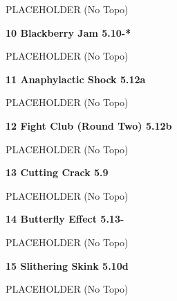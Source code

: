 \begin{multicols}{2}
\begin{adjustwidth}{0.5cm}{}			
PLACEHOLDER (No Topo)
\end{adjustwidth}



\needspace{1.5cm}
\label{rt:Blackberry Jam}
\colorbox{RoyalBlue!20}{
\parbox{0.95\linewidth}{
\textbf{
10 Blackberry Jam 5.10-*  
}}}

\begin{adjustwidth}{0.5cm}{}			
PLACEHOLDER (No Topo)
\end{adjustwidth}



\needspace{1.5cm}
\label{rt:Anaphylactic Shock}
\colorbox{Goldenrod!50}{
\parbox{0.95\linewidth}{
\textbf{
11 Anaphylactic Shock 5.12a  
}}}

\begin{adjustwidth}{0.5cm}{}			
PLACEHOLDER (No Topo)
\end{adjustwidth}



\needspace{1.5cm}
\label{rt:Fight Club (Round Two)}
\colorbox{Goldenrod!50}{
\parbox{0.95\linewidth}{
\textbf{
12 Fight Club (Round Two) 5.12b  
}}}

\begin{adjustwidth}{0.5cm}{}			
PLACEHOLDER (No Topo)
\end{adjustwidth}



\needspace{1.5cm}
\label{rt:Cutting Crack}
\colorbox{green!20}{
\parbox{0.95\linewidth}{
\textbf{
13 Cutting Crack 5.9  
}}}

\begin{adjustwidth}{0.5cm}{}			
PLACEHOLDER (No Topo)
\end{adjustwidth}



\needspace{1.5cm}
\label{rt:Butterfly Effect}
\colorbox{Goldenrod!50}{
\parbox{0.95\linewidth}{
\textbf{
14 Butterfly Effect 5.13-  
}}}

\begin{adjustwidth}{0.5cm}{}			
PLACEHOLDER (No Topo)
\end{adjustwidth}



\needspace{1.5cm}
\label{rt:Slithering Skink}
\colorbox{RoyalBlue!20}{
\parbox{0.95\linewidth}{
\textbf{
15 Slithering Skink 5.10d  
}}}

\begin{adjustwidth}{0.5cm}{}			
PLACEHOLDER (No Topo)
\end{adjustwidth}




\end{multicols}
